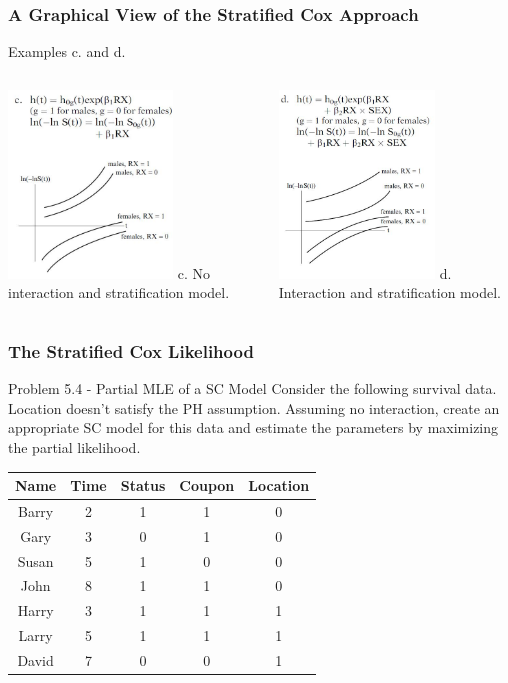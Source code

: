 \documentclass{beamer}
\theoremstyle{definition}
\begin{document}
\begin{frame}
\frametitle{A Graphical View of the Stratified Cox Approach}
\begin{block}{Examples c. and d.}
\begin{columns}
    \begin{column}{0.48\textwidth}
        \includegraphics[width =\textwidth, height=5cm]{CH5_G3.JPG}
        c. No interaction and stratification model.
    \end{column}
    \hspace{-10pt}
    \begin{column}{0.48\textwidth}
         \includegraphics[width =\textwidth, height=5cm]{CH5_G4.JPG}
         d. Interaction and stratification model.
    \end{column}
\end{columns}
\end{block}
\end{frame}

\begin{frame}
\frametitle{The Stratified Cox Likelihood}
\begin{block}{Problem 5.4 - Partial MLE of a SC Model}
Consider the following survival data. Location doesn't satisfy the PH assumption. Assuming no interaction, create an appropriate SC model for this data and estimate the parameters by maximizing the partial likelihood.
\begin{center}
\begin{tabular}{c c c c c} \hline
 Name & Time & Status & Coupon & Location \\ \hline
Barry & 2 & 1 & 1 & 0 \\
 Gary & 3 & 0 & 1 & 0\\
Susan & 5 & 1 & 0 & 0\\
  John & 8 & 1 & 1 & 0\\
  Harry & 3 & 1 & 1 & 1 \\
  Larry & 5 & 1& 1& 1 \\
  David & 7 & 0& 0& 1 \\
\end{tabular}
\end{center}
\end{block}
\end{frame}
\end{document}
